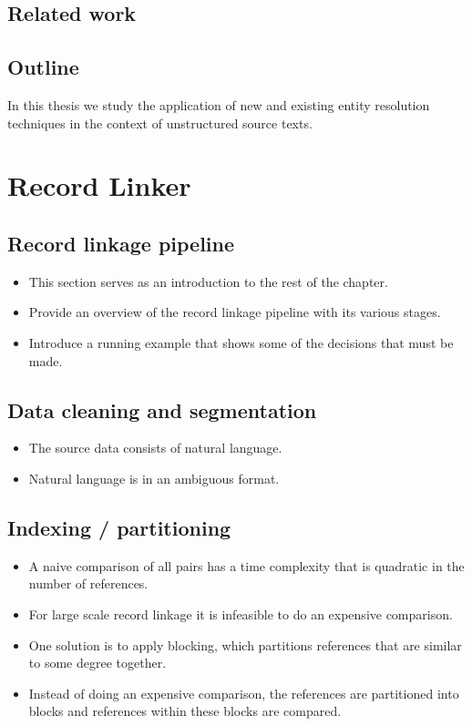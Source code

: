 \documentclass[paper=a4, fontsize=11pt]{scrartcl}					%
\numberwithin{equation}{section}					%
\numberwithin{figure}{section}						%
\numberwithin{table}{section}						%
\begin{document}
\subsection{Related work}

\subsection{Outline}
In this thesis we study the application of new and existing entity resolution techniques in the context of unstructured source texts.



\section{Record Linker}

\subsection{Record linkage pipeline}
\begin{itemize}
    \item This section serves as an introduction to the rest of the chapter.
    \item Provide an overview of the record linkage pipeline with its various stages.
    \item Introduce a running example that shows some of the decisions that must be made.
\end{itemize}

\subsection{Data cleaning and segmentation}
\begin{itemize}
    \item The source data consists of natural language.
    \item Natural language is in an ambiguous format.
\end{itemize}

\subsection{Indexing / partitioning}
\begin{itemize}
    \item A naive comparison of all pairs has a time complexity that is quadratic in the number of references.
    \item For large scale record linkage it is infeasible to do an expensive comparison.
    \item One solution is to apply blocking, which partitions references that are similar to some degree together.
    \item Instead of doing an expensive comparison, the references are partitioned into blocks and references within these blocks are compared.
\end{itemize}
\end{document}
